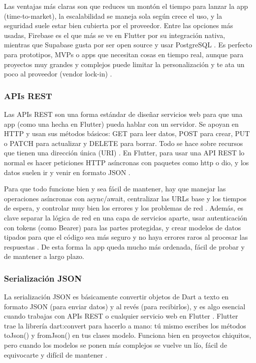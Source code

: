 Las ventajas más claras son que reduces un montón el tiempo para lanzar la app (time-to-market), la escalabilidad se maneja sola según crece el uso, y la seguridad suele estar bien cubierta por el proveedor. Entre las opciones más usadas, Firebase es el que más se ve en Flutter por su integración nativa, mientras que Supabase gusta por ser open source y usar PostgreSQL \cite{VoxturrBackend2026}. Es perfecto para prototipos, MVPs o apps que necesitan cosas en tiempo real, aunque para proyectos muy grandes y complejos puede limitar la personalización y te ata un poco al proveedor (vendor lock-in) \cite{TrootechBackendGuide}.

\subsubsection{APIs REST}
Las APIs REST son una forma estándar de diseñar servicios web para que una app (como una hecha en Flutter) pueda hablar con un servidor. Se apoyan en HTTP y usan sus métodos básicos: GET para leer datos, POST para crear, PUT o PATCH para actualizar y DELETE para borrar. Todo se hace sobre recursos que tienen una dirección única (URI) \cite{CodecademyRESTGuide}. En Flutter, para usar una API REST lo normal es hacer peticiones HTTP asíncronas con paquetes como http o dio, y los datos suelen ir y venir en formato JSON \cite{KrasamoBestPractices}.

Para que todo funcione bien y sea fácil de mantener, hay que manejar las operaciones asíncronas con async/await, centralizar las URLs base y los tiempos de espera, y controlar muy bien los errores y los problemas de red \cite{KrasamoBestPractices}. Además, es clave separar la lógica de red en una capa de servicios aparte, usar autenticación con tokens (como Bearer) para las partes protegidas, y crear modelos de datos tipados para que el código sea más seguro y no haya errores raros al procesar las respuestas \cite{MediumAdvancedIntegration}. De esta forma la app queda mucho más ordenada, fácil de probar y de mantener a largo plazo.

\subsubsection{Serialización JSON}
La serialización JSON es básicamente convertir objetos de Dart a texto en formato JSON (para enviar datos) y al revés (para recibirlos), y es algo esencial cuando trabajas con APIs REST o cualquier servicio web en Flutter \cite{FlutterJsonDocs}. Flutter trae la librería dart:convert para hacerlo a mano: tú mismo escribes los métodos toJson() y fromJson() en tus clases modelo. Funciona bien en proyectos chiquitos, pero cuando los modelos se ponen más complejos se vuelve un lío, fácil de equivocarte y difícil de mantener \cite{MediumJsonUnderstanding}.

